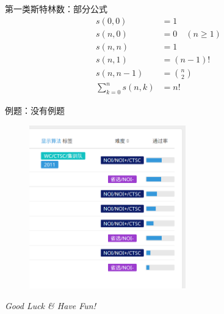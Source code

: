 \documentclass[12pt,aspectratio=169]{beamer}
\begin{document}
\begin{frame}[fragile]{第一类斯特林数：部分公式}
$$
\begin{aligned}
  s(0, 0) &= 1 \\
  s(n, 0) &= 0 \quad (n \ge 1) \\
  s(n, n) &= 1 \\
  s(n, 1) &= (n-1)! \\
  s(n, n-1) &= {n \choose 2} \\
  \sum_{k=0}^{n}s(n, k) &= n!
\end{aligned}
$$
\end{frame}

\begin{frame}[fragile]{例题：没有例题}
\begin{figure}
  \includegraphics[height=200pt]{stirling.png}
\end{figure}
\end{frame}

\begin{frame}{}
  \centering \Large
  \emph{Good Luck \& Have Fun!}
\end{frame}
\end{document}
